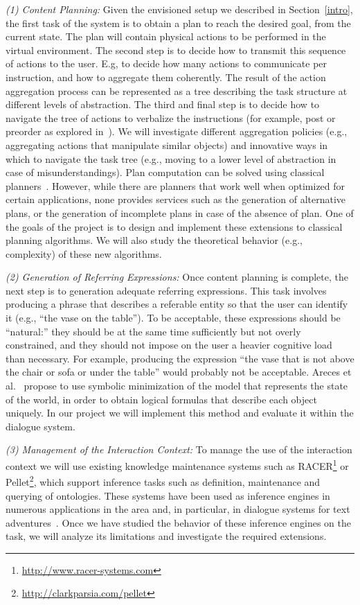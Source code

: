 \emph{(1) Content Planning:} Given the envisioned setup we described in Section~\ref{intro},
the first task of the system is to obtain a plan to reach the desired goal, from the current state.
The plan will contain physical actions to be performed in the virtual environment. The second
step is to decide how to transmit this sequence of actions to the user. E.g, to decide
how many actions to communicate per instruction, and how to aggregate them
coherently. The result of the action aggregation process can be represented as a
tree describing the task structure at different levels of abstraction. The third
and final step is to decide how to navigate the tree of actions to verbalize the
instructions (for example, post or preorder as
explored in~\cite{foster-etal-ijcai2009}). We will investigate
different aggregation policies (e.g., aggregating actions that
manipulate similar objects) and innovative ways in which to navigate the task tree
(e.g., moving to a lower level of abstraction in case of misunderstandings).
Plan computation can be solved using classical planners~\cite{nau04}.
However, while there are planners that work well when optimized for certain
applications, none provides services such as the generation of alternative
plans, or the generation of incomplete plans in case of the absence of plan.
One of the goals of the project is to design and implement these extensions to 
classical planning algorithms. We will also study the theoretical behavior (e.g., complexity) of
these new algorithms. 

\emph{(2) Generation of Referring Expressions:} Once content planning is
complete, the next step is to generation adequate referring expressions. 
This task involves producing a phrase that describes a referable entity so that the user can
identify it (e.g., ``the vase on the table''). To be
acceptable, these expressions should be ``natural:'' they should be at the same time
sufficiently but not overly constrained, and they should not impose on the user a heavier 
cognitive load than necessary. For example, producing the expression 
``the vase that is not above the chair or sofa or under the
table'' would probably not be acceptable. Areces et al.~ propose to
use symbolic minimization of the model that represents the state of the world, in
order to obtain logical formulas that describe each object uniquely. In our
project we will implement this method and evaluate it within the dialogue system.

\emph{(3) Management of the Interaction Context:} To manage the use of
the interaction context we will use existing knowledge maintenance systems such as
RACER\footnote{\url{http://www.racer-systems.com}} or Pellet\footnote{\url{http://clarkparsia.com/pellet}}, which support inference tasks such as
definition, maintenance and querying of ontologies. These systems have been used
as inference engines in numerous applications in
the area and, in particular, in dialogue systems for text adventures~\cite{benotti09b}. Once we
have studied the behavior of these inference engines on the task, we will
analyze its limitations and investigate the required extensions.

